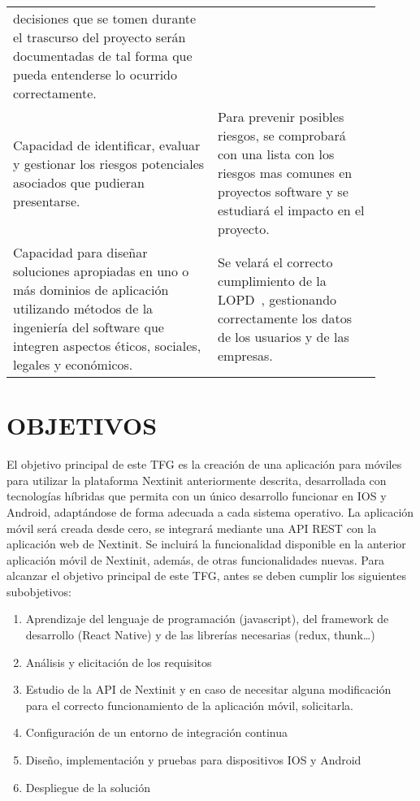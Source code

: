\documentclass{pre-tfg}
\begin{document}
\begin{table}[hp]
\begin{tabular}{p{0.5\linewidth}p{0.4\linewidth}}
            decisiones que se tomen durante el trascurso del proyecto serán documentadas de tal forma que
            pueda entenderse lo ocurrido correctamente. \\
            Capacidad de identificar, evaluar y gestionar los riesgos potenciales asociados que pudieran presentarse.
            & Para prevenir posibles riesgos, se comprobará con una lista con los riesgos mas comunes en proyectos
            software y se estudiará el impacto en el proyecto. \\
            Capacidad para diseñar soluciones apropiadas en uno o más dominios de aplicación utilizando métodos
            de la ingeniería del software que integren aspectos éticos, sociales, legales y económicos.
            & Se velará el correcto cumplimiento de la LOPD~\cite{LOPD}, gestionando correctamente los datos de los
            usuarios y de las empresas.\\
            \hline
        \end{tabular}
    \end{table}

	\clearpage

    \section{OBJETIVOS}

    El objetivo principal de este TFG es la creación de una aplicación para móviles para utilizar la plataforma 
    Nextinit anteriormente descrita, desarrollada con tecnologías híbridas que permita con un único 
    desarrollo funcionar en IOS y Android, adaptándose de forma adecuada a cada sistema operativo. La 
    aplicación móvil será creada desde cero, se integrará mediante una API REST con la aplicación web de 
    Nextinit. Se incluirá la funcionalidad disponible en la anterior aplicación móvil de Nextinit, además, de otras 
    funcionalidades nuevas.
    \newline\newline
    Para alcanzar el objetivo principal de este TFG, antes se deben cumplir los siguientes subobjetivos:
    \begin{enumerate}
        \item Aprendizaje del lenguaje de programación (javascript), del framework de desarrollo (React Native)
        y de las librerías necesarias (redux, thunk…)
        \item Análisis y elicitación de los requisitos
        \item Estudio de la API de Nextinit y en caso de necesitar alguna modificación para el correcto
        funcionamiento de la aplicación móvil, solicitarla.
        \item Configuración de un entorno de integración continua
        \item Diseño, implementación y pruebas para dispositivos IOS y Android
        \item Despliegue de la solución
    \end{enumerate}
\end{document}
